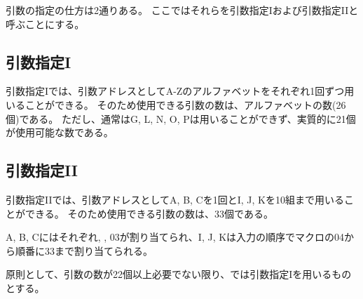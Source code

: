 




引数の指定の仕方は2通りある。
ここではそれらを引数指定Iおよび引数指定IIと呼ぶことにする。


\subsection{引数指定I}
引数指定Iでは、引数アドレスとしてA-Zのアルファベットをそれぞれ1回ずつ用いることができる。
そのため使用できる引数の数は、アルファベットの数(26個)である。
ただし、通常はG, L, N, O, Pは用いることができず、実質的に21個が使用可能な数である。


\subsection{引数指定II}
引数指定IIでは、引数アドレスとしてA, B, Cを1回とI, J, Kを10組まで用いることができる。
そのため使用できる引数の数は、33個である。

A, B, Cにはそれぞれ, , \ttNum03が割り当てられ、I, J, Kは入力の順序でマクロの\ttNum04から順番に\ttNum33まで割り当てられる。



\clearpage
原則として、引数の数が22個以上必要でない限り、\DMC では引数指定Iを用いるものとする。


